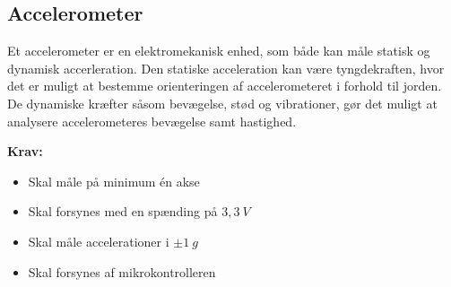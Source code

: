 \subsection{Accelerometer}
Et accelerometer er en elektromekanisk enhed, som både kan måle statisk og dynamisk accerleration. Den statiske acceleration kan være tyngdekraften, hvor det er muligt at bestemme orienteringen af accelerometeret i forhold til jorden. De dynamiske kræfter såsom bevægelse, stød og vibrationer, gør det muligt at analysere accelerometeres bevægelse samt hastighed. 
\vspace{3mm}

\textbf{Krav:}
\begin{itemize}
\item Skal måle på minimum én akse
\item Skal forsynes med en spænding på $3,3~V$
\item Skal måle accelerationer i $\pm1~g$
\item Skal forsynes af mikrokontrolleren
\end{itemize}
